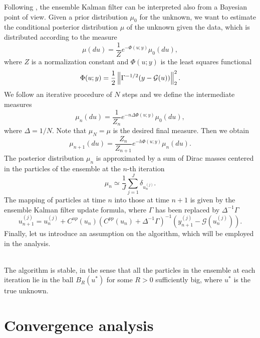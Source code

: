 \documentclass[10pt]{article}
\begin{document}
Following \cite{ScS17}, the ensemble Kalman filter can be interpreted also from a Bayesian point of view. Given a prior distribution $\mu_0$ for the unknown, we want to estimate the conditional posterior distribution $\mu$ of the unknown given the data, which is distributed according to the measure
\begin{equation*}
\mu(du) = \frac{1}{Z} e^{- \Phi(u;y)} \mu_0(du),
\end{equation*}
where $Z$ is a normalization constant and $\Phi(u;y)$ is the least squares functional
\[ \Phi(u;y) = \frac{1}{2} \left\| \Gamma^{-1/2} (y - \mathcal{G}(u)) \right\|_2^2. \]
We follow an iterative procedure of $N$ steps and we define the intermediate measures
\begin{equation*}
\mu_n(du) = \frac{1}{Z_n} e^{- n \Delta \Phi(u;y)} \mu_0(du),
\end{equation*}
where $\Delta = 1/N$. Note that $\mu_N = \mu$ is the desired final measure. Then we obtain
\begin{equation*}
\mu_{n+1}(du) = \frac{Z_n}{Z_{n+1}} e^{- h \Phi(u;y)} \mu_n(du).
\end{equation*}
The posterior distribution $\mu_n$ is approximated by a sum of Dirac masses centered in the particles of the ensemble at the $n$-th iteration
\begin{equation}
\label{mu_delta}
\mu_n \simeq \frac{1}{J} \sum_{j=1}^J \delta_{u_{n}^{(j)}}.
\end{equation}
The mapping of particles at time $n$ into those at time $n+1$ is given by the ensemble Kalman filter update formula, where $\Gamma$ has been replaced by $\Delta^{-1} \Gamma$
\begin{equation*}
u_{n+1}^{(j)} = u_n^{(j)} + C^{up}(u_n) ( C^{pp}(u_n) + \Delta^{-1} \Gamma )^{-1} (y_{n+1}^{(j)} - \mathcal{G}(u_n^{(j)})).
\end{equation*}
Finally, let us introduce an assumption on the algorithm, which will be employed in the analysis.
\begin{assumption}
\label{ass_algo}
\leavevmode \\
The algorithm is stable, in the sense that all the particles in the ensemble at each iteration lie in the ball $B_R(u^*)$ for some $R > 0$ sufficiently big, where $u^*$ is the true unknown.
\end{assumption}

\section{Convergence analysis}
\end{document}
